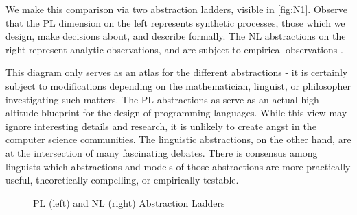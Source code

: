 We make this comparison via two abstraction ladders, visible in
\autoref{fig:N1}. Observe that the PL dimension on the left represents synthetic
processes, those which we design, make decisions about, and describe formally.
The NL abstractions on the right represent analytic observations, and are
subject to empirical observations .

This diagram only serves as an atlas for the different abstractions - it is
certainly subject to modifications depending on the mathematician, linguist, or
philosopher investigating such matters. The PL abstractions as serve as an
actual high altitude blueprint for the design of programming languages. While
this view may ignore interesting details and research, it is unlikely
to create angst in the computer science communities. The linguistic
abstractions, on the other hand, are at the intersection of many fascinating
debates. There is consensus among linguists which abstractions and models of
those abstractions are more practically useful, theoretically compelling, or
empirically testable.

\begin{figure}
\centering
{}
\hspace{1cm}
\caption{PL (left) and NL (right) Abstraction Ladders} \label{fig:N1}
\end{figure}


